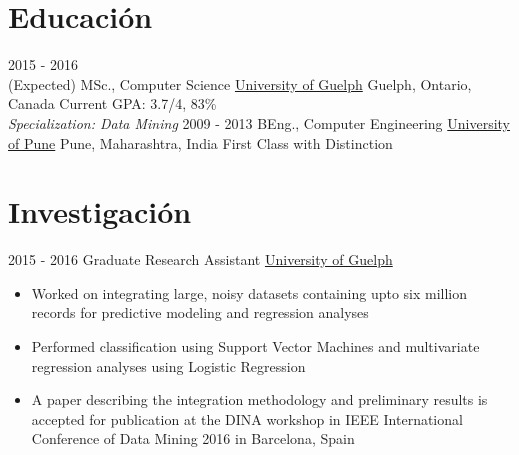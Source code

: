 \documentclass[letterpaper]{twentysecondcv} %
\begin{document}
\makeprofile %

\section{Educación}

\begin{twenty} %
	\twentyitem
    	{2015 - 2016 \\ (Expected)}
        {MSc., Computer Science}
        {\href{http://www.uoguelph.ca/}{University of Guelph}}
        {Guelph, Ontario, Canada}
        {Current GPA: 3.7/4, 83\% \\ \textit{Specialization: Data Mining}}
	\twentyitem
    	{2009 - 2013}
        {BEng., Computer Engineering}
        {\href{http://www.unipune.ac.in/}{University of Pune}}
        {Pune, Maharashtra, India}
        {First Class with Distinction}
\end{twenty}


\section{Investigación}
\begin{twenty}
	\twentyitem
    	{2015 - 2016}
        {Graduate Research Assistant}
        {\href{http://www.uoguelph.ca/}{University of Guelph}}
        {}
        {
        {\begin{itemize}
        \item Worked on integrating large, noisy datasets containing upto six million records for predictive modeling and regression analyses
        \item Performed classification using Support Vector Machines and multivariate regression analyses using Logistic Regression
        \item A paper describing the integration methodology and preliminary results is accepted for publication at the DINA workshop in IEEE International Conference of Data Mining 2016 in Barcelona, Spain
    \end{itemize}}
        }
\end{twenty}

\end{document}

